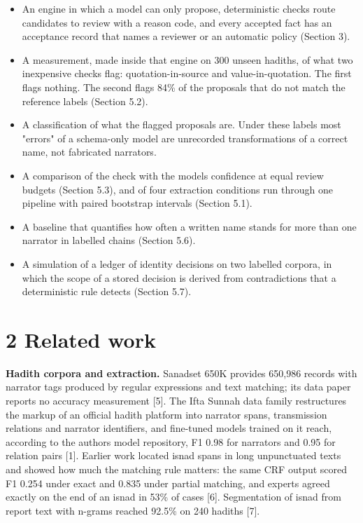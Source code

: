 \documentclass[
  english,
]{article}
\providecommand{\tightlist}{%
  \setlength{\itemsep}{0pt}\setlength{\parskip}{0pt}}
\begin{document}
\begin{itemize}
\tightlist
\item
  An engine in which a model can only propose, deterministic checks
  route candidates to review with a reason code, and every accepted fact
  has an acceptance record that names a reviewer or an automatic policy
  (Section 3).
\item
  A measurement, made inside that engine on 300 unseen hadiths, of what
  two inexpensive checks flag: quotation-in-source and
  value-in-quotation. The first flags nothing. The second flags 84\% of
  the proposals that do not match the reference labels (Section 5.2).
\item
  A classification of what the flagged proposals are. Under these labels
  most "errors" of a schema-only model are unrecorded transformations of
  a correct name, not fabricated narrators.
\item
  A comparison of the check with the model\textquotesingle s confidence
  at equal review budgets (Section 5.3), and of four extraction
  conditions run through one pipeline with paired bootstrap intervals
  (Section 5.1).
\item
  A baseline that quantifies how often a written name stands for more
  than one narrator in labelled chains (Section 5.6).
\item
  A simulation of a ledger of identity decisions on two labelled
  corpora, in which the scope of a stored decision is derived from
  contradictions that a deterministic rule detects (Section 5.7).
\end{itemize}

\section{2 Related work}\label{related-work}

\textbf{Hadith corpora and extraction.} Sanadset 650K provides 650,986
records with narrator tags produced by regular expressions and text
matching; its data paper reports no accuracy measurement {[}5{]}. The
Ifta Sunnah data family restructures the markup of an official hadith
platform into narrator spans, transmission relations and narrator
identifiers, and fine-tuned models trained on it reach, according to the
author\textquotesingle s model repository, F1 0.98 for narrators and
0.95 for relation pairs {[}1{]}. Earlier work located isnad spans in
long unpunctuated texts and showed how much the matching rule matters:
the same CRF output scored F1 0.254 under exact and 0.835 under partial
matching, and experts agreed exactly on the end of an isnad in 53\% of
cases {[}6{]}. Segmentation of isnad from report text with n-grams
reached 92.5\% on 240 hadiths {[}7{]}.
\end{document}
